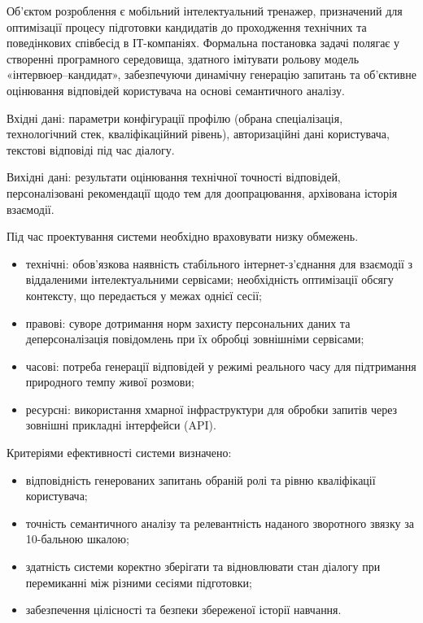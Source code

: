Об'єктом розроблення є мобільний інтелектуальний тренажер, призначений
для оптимізації процесу підготовки кандидатів до проходження технічних
та поведінкових співбесід в ІТ-компаніях. Формальна постановка задачі
полягає у створенні програмного середовища, здатного імітувати рольову
модель «інтерв\textquotesingle юер--кандидат», забезпечуючи динамічну
генерацію запитань та об'єктивне оцінювання відповідей користувача на
основі семантичного аналізу.

Вхідні дані: параметри конфігурації профілю (обрана спеціалізація,
технологічний стек, кваліфікаційний рівень), авторизаційні дані
користувача, текстові відповіді під час діалогу.

Вихідні дані: результати оцінювання технічної точності відповідей,
персоналізовані рекомендації щодо тем для доопрацювання, архівована
історія взаємодії.

Під час проектування системи необхідно враховувати низку обмежень.

\begin{itemize}
\item
  технічні: обов'язкова наявність стабільного інтернет-з'єднання для
  взаємодії з віддаленими інтелектуальними сервісами; необхідність
  оптимізації обсягу контексту, що передається у межах однієї сесії;
\item
  правові: суворе дотримання норм захисту персональних даних та
  деперсоналізація повідомлень при їх обробці зовнішніми сервісами;
\item
  часові: потреба генерації відповідей у режимі реального часу для
  підтримання природного темпу живої розмови;
\item
  ресурсні: використання хмарної інфраструктури для обробки запитів
  через зовнішні прикладні інтерфейси (API).
\end{itemize}

Критеріями ефективності системи визначено:

\begin{itemize}
\item
  відповідність генерованих запитань обраній ролі та рівню кваліфікації
  користувача;
\item
  точність семантичного аналізу та релевантність наданого зворотного
  зв\textquotesingle язку за 10-бальною шкалою;
\item
  здатність системи коректно зберігати та відновлювати стан діалогу при
  перемиканні між різними сесіями підготовки;
\item
  забезпечення цілісності та безпеки збереженої історії навчання.
\end{itemize}

